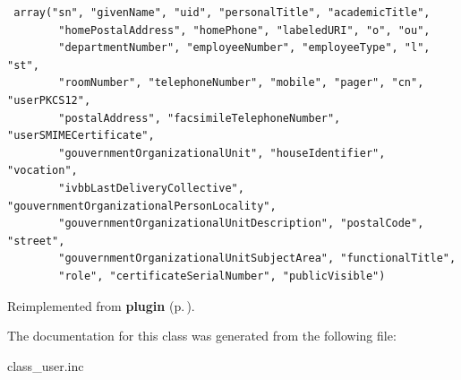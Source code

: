 \footnotesize\begin{verbatim} array("sn", "givenName", "uid", "personalTitle", "academicTitle",
        "homePostalAddress", "homePhone", "labeledURI", "o", "ou",
        "departmentNumber", "employeeNumber", "employeeType", "l", "st",
        "roomNumber", "telephoneNumber", "mobile", "pager", "cn", "userPKCS12",
        "postalAddress", "facsimileTelephoneNumber", "userSMIMECertificate",
        "gouvernmentOrganizationalUnit", "houseIdentifier", "vocation",
        "ivbbLastDeliveryCollective", "gouvernmentOrganizationalPersonLocality",
        "gouvernmentOrganizationalUnitDescription", "postalCode", "street",
        "gouvernmentOrganizationalUnitSubjectArea", "functionalTitle",
        "role", "certificateSerialNumber", "publicVisible")
\end{verbatim}\normalsize 


Reimplemented from {\bf plugin} {\rm (p.\,\pageref{classplugin})}.

The documentation for this class was generated from the following file:\begin{CompactItemize}
\item 
class\_\-user.inc\end{CompactItemize}
